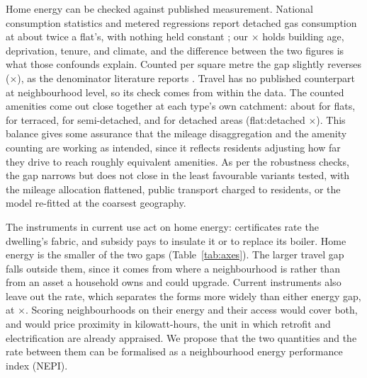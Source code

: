\documentclass[pdflatex,sn-nature]{sn-jnl}
\begin{document}
Home energy can be checked against published measurement. National consumption statistics and metered regressions report detached gas consumption at about twice a flat's, with nothing held constant \citep{need2024,ehs2024,wyatt2013}; our \nepiheatGap$\times$ holds building age, deprivation, tenure, and climate, and the difference between the two figures is what those confounds explain. Counted per square metre the gap slightly reverses (\nepimSqGap$\times$), as the denominator literature reports \citep{norman2006}. Travel has no published counterpart at neighbourhood level, so its check comes from within the data. The counted amenities come out close together at each type's own catchment: about \nepicatchAmenFlat{} for flats, \nepicatchAmenTerr{} for terraced, \nepicatchAmenSemi{} for semi-detached, and \nepicatchAmenDet{} for detached areas (flat:detached \nepicatchAmen$\times$). This balance gives some assurance that the mileage disaggregation and the amenity counting are working as intended, since it reflects residents adjusting how far they drive to reach roughly equivalent amenities. As per the robustness checks, the gap narrows but does not close in the least favourable variants tested, with the mileage allocation flattened, public transport charged to residents, or the model re-fitted at the coarsest geography.

The instruments in current use act on home energy: certificates rate the dwelling's fabric, and subsidy pays to insulate it or to replace its boiler. Home energy is the smaller of the two gaps (Table~\ref{tab:axes}). The larger travel gap falls outside them, since it comes from where a neighbourhood is rather than from an asset a household owns and could upgrade. Current instruments also leave out the rate, which separates the forms more widely than either energy gap, at \nepirate$\times$. Scoring neighbourhoods on their energy and their access would cover both, and would price proximity in kilowatt-hours, the unit in which retrofit and electrification are already appraised. We propose that the two quantities and the rate between them can be formalised as a neighbourhood energy performance index (NEPI).
\end{document}
